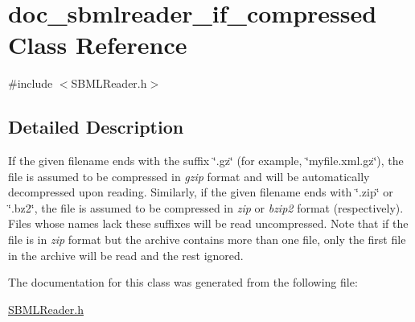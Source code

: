 \hypertarget{classdoc__sbmlreader__if__compressed}{}\section{doc\+\_\+sbmlreader\+\_\+if\+\_\+compressed Class Reference}
\label{classdoc__sbmlreader__if__compressed}


{\ttfamily \#include $<$S\+B\+M\+L\+Reader.\+h$>$}



\subsection{Detailed Description}
\begin{DoxyParagraph}{}
If the given filename ends with the suffix {\ttfamily \char`\"{}.\+gz\char`\"{}} (for example, {\ttfamily \char`\"{}myfile.\+xml.\+gz\char`\"{}}), the file is assumed to be compressed in {\itshape gzip} format and will be automatically decompressed upon reading. Similarly, if the given filename ends with {\ttfamily \char`\"{}.\+zip\char`\"{}} or {\ttfamily \char`\"{}.\+bz2\char`\"{}}, the file is assumed to be compressed in {\itshape zip} or {\itshape bzip2} format (respectively). Files whose names lack these suffixes will be read uncompressed. Note that if the file is in {\itshape zip} format but the archive contains more than one file, only the first file in the archive will be read and the rest ignored. 
\end{DoxyParagraph}


The documentation for this class was generated from the following file\+:\begin{DoxyCompactItemize}
\item 
\hyperlink{_s_b_m_l_reader_8h}{S\+B\+M\+L\+Reader.\+h}\end{DoxyCompactItemize}
